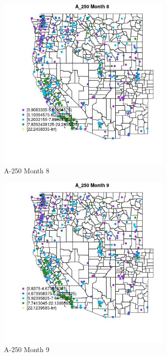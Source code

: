 \begin{figure} 
\centering  
\includegraphics[width=0.77\textwidth]{Code_Outputs/ML_input_report_ML_input_PM25_Step5_part_d_de_duplicated_aves_ML_input_MapObsMo8A_250.jpg} 
\caption{\label{fig:ML_input_report_ML_input_PM25_Step5_part_d_de_duplicated_aves_ML_inputMapObsMo8A_250}A-250 Month 8} 
\end{figure} 
 

\begin{figure} 
\centering  
\includegraphics[width=0.77\textwidth]{Code_Outputs/ML_input_report_ML_input_PM25_Step5_part_d_de_duplicated_aves_ML_input_MapObsMo9A_250.jpg} 
\caption{\label{fig:ML_input_report_ML_input_PM25_Step5_part_d_de_duplicated_aves_ML_inputMapObsMo9A_250}A-250 Month 9} 
\end{figure} 
 


